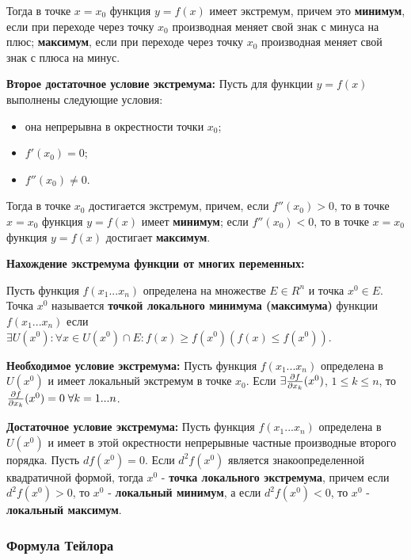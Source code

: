 \documentclass[12pt]{matmex-diploma}
\begin{document}
            Тогда в точке $x = x_0$ функция $y = f(x)$ имеет экстремум, причем это \textbf{минимум}, если при переходе через точку $x_0$ производная меняет свой знак с минуса на плюс; \textbf{максимум}, если при переходе через точку $x_0$ производная меняет свой знак с плюса на минус.
            
            \textbf{Второе достаточное условие экстремума:}
            Пусть для функции $y = f(x)$ выполнены следующие условия:
            \begin{itemize}
                \item она непрерывна в окрестности точки $x_0$;
                \item $f'(x_0) = 0$;
                \item $f''(x_0) \neq 0$.
            \end{itemize}
            
            Тогда в точке $x_0$ достигается экстремум, причем, если $f''(x_0) > 0$, то в точке $x = x_0$ функция $y = f(x)$ имеет \textbf{минимум}; если $f''(x_0) < 0$, то в точке $x = x_0$ функция $y = f(x)$ достигает \textbf{максимум}.
            
            \textbf{Нахождение экстремума функции от многих переменных:}
            
            Пусть функция $f(x_1 ... x_n)$ определена на множестве $E \in R^n$ и точка $x^0 \in E$. Точка $x^0$  называется \textbf{точкой локального минимума (максимума)} функции $f(x_1 ... x_n)$ если$ \exists U(x^0) : \forall x \in U(x^0) \cap E : f(x) \geq f(x^0)(f(x) \leq f(x^0))$.
            
            \textbf{Необходимое условие экстремума:}
            Пусть функция $f(x_1 ... x_n)$ определена в $U(x^0)$ и имеет локальный экстремум в точке $x_0$. Если $\exists {\partial f \over \partial x_k} (x^0) $, $1 \leq k \leq n$, то ${\partial f \over \partial x_k} (x^0) = 0 \; \forall k = 1...n$.
            
            \textbf{Достаточное условие экстремума:}
            Пусть функция $f(x_1 ... x_n)$ определена в $U(x^0)$ и имеет в этой окрестности непрерывные частные производные второго порядка. Пусть $df(x^0) = 0$. Если $d^2f(x^0)$ является знакоопределенной квадратичной формой, тогда $x^0$ - \textbf{точка локального экстремума}, причем если $d^2f(x^0) > 0$, то $x^0$ - \textbf{локальный минимум}, а если $d^2f(x^0) < 0$, то $x^0$ - \textbf{локальный максимум}.
            
        \subsubsection*{Формула Тейлора}
        
\end{document}
